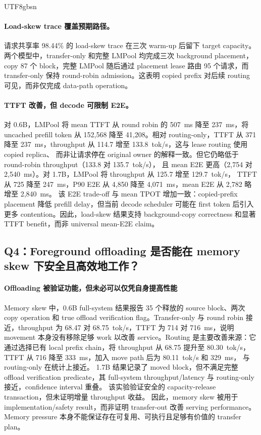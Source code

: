 \documentclass[11pt,a4paper]{article}
\newcommand{\sys}{LMPool}
\begin{document}
\begin{CJK*}{UTF8}{gbsn}
\paragraph{Load-skew trace 覆盖预期路径。} 请求共享率 98.44\% 的 load-skew trace 在三次 warm-up
后留下 target capacity。两个模型中，transfer-only 和完整 \sys{} 均完成三次 background placement，
copy 87 个 block，完整 \sys{} 随后通过 placement lease 路由 95 个请求，而 transfer-only 保持
round-robin admission。这表明 copied prefix 对后续 routing 可见，而非仅完成 data-path operation。

\paragraph{TTFT 改善，但 decode 可限制 E2E。} 对 0.6B，\sys{} 将 mean TTFT 从 round robin 的
507~ms 降至 237~ms，将 uncached prefill token 从 152,568 降至 41,208。相对 routing-only，TTFT
从 371 降至 237~ms，throughput 从 114.7 增至 133.8~tok/s，这与 lease routing 使用 copied replica、
而非让请求停在 original owner 的解释一致。但它仍略低于 round-robin throughput（133.8 对 135.7~tok/s），
且 mean E2E 更高（2,754 对 2,540~ms）。对 1.7B，\sys{} 将 throughput 从 125.7 增至 129.7~tok/s，
TTFT 从 725 降至 247~ms，P90 E2E 从 4,850 降至 4,071~ms，mean E2E 从 2,782 略增至 2,840~ms。
该 E2E trade-off 与 mean TPOT 增加一致：copied-prefix placement 降低 prefill delay，但当前 decode
scheduler 可能在 first token 后引入更多 contention。因此，load-skew 结果支持 background-copy
correctness 和显著 TTFT benefit，而非 universal mean-E2E claim。

\subsection{Q4：Foreground offloading 是否能在 memory skew
下安全且高效地工作？}

\paragraph{Offloading 被验证功能，但未必可以仅凭自身提高性能}
Memory skew 中，0.6B full-system 结果报告 35 个释放的
source block、两次 copy operation 和 true offload verification flag。Transfer-only 与 round robin
接近，throughput 为 68.47 对 68.75~tok/s，TTFT 为 714 对 716~ms，说明 movement 本身没有移除足够
work 以改善 service。Routing 是主要改善来源：它通过选择已有 local prefix chain，将 throughput 从
68.75 提升至 80.30~tok/s，TTFT 从 716 降至 333~ms，加入 move path 后为 80.11~tok/s 和 329~ms，
与 routing-only 在统计上接近。
1.7B 结果记录了 moved block，但不满足完整 offload
verification predicate，其 full-system throughput/latency 与 routing-only 接近，confidence interval
重叠。
该实验验证安全的 capacity-release transaction，但未证明增量 throughput
收益。
因此，memory skew 被用于 implementation/safety result，而非证明 transfer-out 改善 serving
performance。Memory pressure 本身不能保证存在可复用、可执行且足够有价值的 transfer plan。


\end{CJK*}
\end{document}
